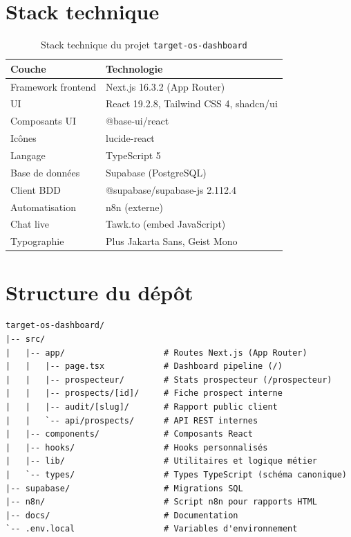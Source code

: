 \documentclass[11pt,a4paper]{report}
\begin{document}
\section{Stack technique}

\begin{table}[h]
\centering
\begin{tabular}{@{}ll@{}}
\toprule
\textbf{Couche} & \textbf{Technologie} \\
\midrule
Framework frontend & Next.js 16.3.2 (App Router) \\
UI & React 19.2.8, Tailwind CSS 4, shadcn/ui \\
Composants UI & @base-ui/react \\
Icônes & lucide-react \\
Langage & TypeScript 5 \\
Base de données & Supabase (PostgreSQL) \\
Client BDD & @supabase/supabase-js 2.112.4 \\
Automatisation & n8n (externe) \\
Chat live & Tawk.to (embed JavaScript) \\
Typographie & Plus Jakarta Sans, Geist Mono \\
\bottomrule
\end{tabular}
\caption{Stack technique du projet \texttt{target-os-dashboard}}
\end{table}

\section{Structure du dépôt}

\begin{lstlisting}
target-os-dashboard/
|-- src/
|   |-- app/                    # Routes Next.js (App Router)
|   |   |-- page.tsx            # Dashboard pipeline (/)
|   |   |-- prospecteur/        # Stats prospecteur (/prospecteur)
|   |   |-- prospects/[id]/     # Fiche prospect interne
|   |   |-- audit/[slug]/       # Rapport public client
|   |   `-- api/prospects/      # API REST internes
|   |-- components/             # Composants React
|   |-- hooks/                  # Hooks personnalisés
|   |-- lib/                    # Utilitaires et logique métier
|   `-- types/                  # Types TypeScript (schéma canonique)
|-- supabase/                   # Migrations SQL
|-- n8n/                        # Script n8n pour rapports HTML
|-- docs/                       # Documentation
`-- .env.local                  # Variables d'environnement
\end{lstlisting}
\end{document}
